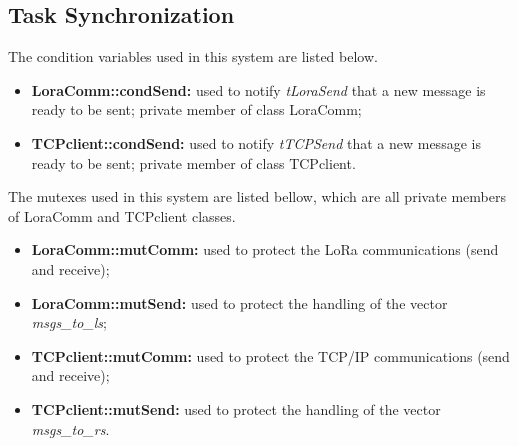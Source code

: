\subsection{Task Synchronization}

The condition variables used in this system are listed below.

\begin{itemize}
	\item \textbf{LoraComm::condSend:} used to notify \textit{tLoraSend} that a new message is ready to be sent; private member of class LoraComm;
	\item \textbf{TCPclient::condSend:} used to notify \textit{tTCPSend} that a new message is ready to be sent; private member of class TCPclient.
\end{itemize}

The mutexes used in this system are listed bellow, which are all private members of LoraComm and TCPclient classes.

\begin{itemize}
	\item \textbf{LoraComm::mutComm:} used to protect the LoRa communications (send and receive);
	\item \textbf{LoraComm::mutSend:}	used to protect the handling of the vector \textit{msgs\_to\_ls};
	
	\item \textbf{TCPclient::mutComm:} used to protect the TCP/IP communications (send and receive);
	\item \textbf{TCPclient::mutSend:} used to protect the handling of the vector \textit{msgs\_to\_rs}.
\end{itemize}


